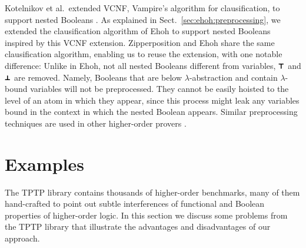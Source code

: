 Kotelnikov et al.\ extended VCNF, Vampire's algorithm for clausification, to support
nested Booleans \cite{kotelnikov-16-fool}. As explained in Sect.~\ref{sec:ehoh:preprocessing}, we extended
the clausification algorithm of Ehoh to support nested Booleans inspired by this VCNF extension.
Zipperposition and Ehoh share the
same clausification algorithm, enabling us to reuse the extension, with one
notable difference:
Unlike in Ehoh, not all nested Booleans different from variables, $\pmb{\top}$ and $\pmb{\bot}$
are removed. Namely, Booleans that are below $\lambda$-abstraction
and contain $\lambda$-bound variables will not be preprocessed. They cannot be easily hoisted to the level of an atom in which
they appear, since this process might leak any variables bound in the context
in which the nested Boolean appears. Similar preprocessing techniques are used in other higher-order provers
\cite{wskb-16-effective-norm}.

\section{Examples}
\label{sect:bool:examples}

The TPTP library \cite{gs-17-tptp} contains thousands of higher-order benchmarks, many of them hand-crafted
to point out subtle interferences of functional and Boolean properties of higher-order logic. In this section
we discuss some problems from the TPTP library that illustrate the advantages and disadvantages
of our approach.

